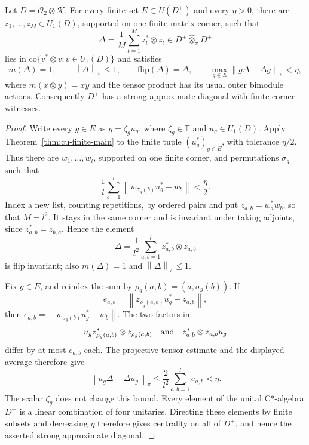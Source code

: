 \begin{corollary}\label{cor:cu-strong-diagonal}
 Let $D=\mathcal{O}_2\otimes\mathcal{K}$. For
every finite set $E\subset U(D^+)$ and every $\eta>0$, there are $z_1,\ldots,z_M\in U_1(D)$, supported on one finite matrix corner, such that 
\begin{equation*}
\Delta=\frac1M\sum_{t=1}^M z_t^*\otimes z_t \in D^+\widehat\otimes_\pi D^+
\end{equation*}
lies in $\mathrm{co}\{v^*\otimes v:v\in U_1(D)\}$ and satisfies 
\begin{equation*}
m(\Delta)=1,\qquad \left\|\Delta\right\|_\pi\leq1,\qquad \mathrm{flip}(\Delta)=\Delta,\qquad \max_{g\in E}\left\|g\Delta-\Delta g\right\|_\pi<\eta,
\end{equation*}
where $m(x\otimes y)=xy$ and the tensor product has its usual outer bimodule
actions. Consequently $D^+$ has a strong approximate diagonal with
finite-corner witnesses.
\end{corollary}

\begin{proof}
Write every $g\in E$ as $g=\zeta_g u_g$, where $\zeta_g\in\mathbb{T}$ and $u_g\in U_1(D)$. Apply Theorem~\ref{thm:cu-finite-main} to the finite tuple $(u_g^*)_{g\in E}$, with tolerance $\eta/2$. Thus there are $w_1,\ldots,w_l$,
supported on one finite corner, and permutations $\sigma_g$ such that 
\begin{equation*}
\frac1l\sum_{b=1}^l \left\|w_{\sigma_g(b)}u_g^*-w_b\right\|<\frac\eta2.
\end{equation*}
Index a new list, counting repetitions, by ordered pairs and put $z_{a,b}=w_a^*w_b$, so that $M=l^2$. It stays in the same corner and is
invariant under taking adjoints, since $z_{a,b}^*=z_{b,a}$. Hence the
element 
\begin{equation*}
\Delta=\frac1{l^2}\sum_{a,b=1}^l z_{a,b}^*\otimes z_{a,b}
\end{equation*}
is flip invariant; also $m(\Delta)=1$ and $\left\|\Delta\right\|_\pi\leq1$.

Fix $g\in E$, and reindex the sum by $\rho_g(a,b)=(a,\sigma_g(b))$. If 
\begin{equation*}
e_{a,b}=\left\|z_{\rho_g(a,b)}u_g^*-z_{a,b}\right\|,
\end{equation*}
then $e_{a,b}=\left\|w_{\sigma_g(b)}u_g^*-w_b\right\|$. The two factors in 
\begin{equation*}
u_g z_{\rho_g(a,b)}^*\otimes z_{\rho_g(a,b)} \quad\hbox{and}\quad
z_{a,b}^*\otimes z_{a,b}u_g
\end{equation*}
differ by at most $e_{a,b}$ each. The projective tensor estimate and the
displayed average therefore give 
\begin{equation*}
\left\|u_g\Delta-\Delta u_g\right\|_\pi \leq\frac2{l^2}\sum_{a,b=1}^l
e_{a,b}<\eta.
\end{equation*}
The scalar $\zeta_g$ does not change this bound. Every element of the unital 
C*-algebra $D^+$ is a linear combination of four unitaries. Directing
these elements by finite subsets and decreasing $\eta$ therefore gives
centrality on all of $D^+$, and hence the asserted strong approximate
diagonal.
\end{proof}

